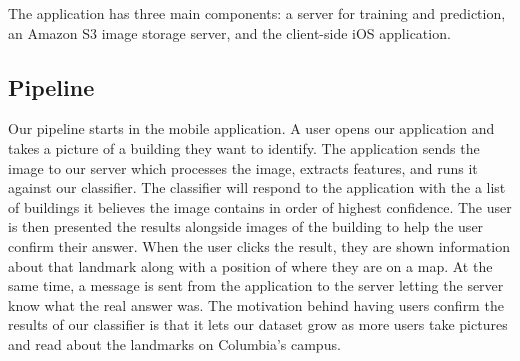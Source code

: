 The application has three main components: a server for training and prediction, an Amazon S3 image storage server, and the client-side iOS application. 

\subsection{Pipeline}
Our pipeline starts in the mobile application. A user opens our application and takes a picture of a building they want to identify. The application sends the image to our server which processes the image, extracts features, and runs it against our classifier. The classifier will respond to the application with the a list of buildings it believes the image contains in order of highest confidence. The user is then presented the results alongside images of the building to help the user confirm their answer. When the user clicks the result, they are shown information about that landmark along with a position of where they are on a map. At the same time, a message is sent from the application to the server letting the server know what the real answer was. The motivation behind having users confirm the results of our classifier is that it lets our dataset grow as more users take pictures and read about the landmarks on Columbia's campus.
